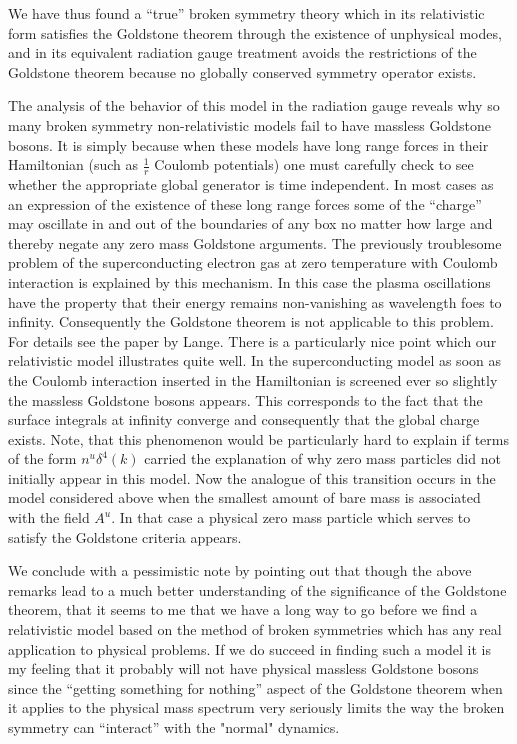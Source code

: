 \documentclass[%
  12pt,
  paper=letter,
  abstracton,
  pagesize=auto,
  version=last,
  DIV=calc
  ]{scrartcl}
\begin{document}
We have thus found a ``true'' broken symmetry theory which in its
relativistic form satisfies the Goldstone theorem through the
existence of unphysical modes, and in its equivalent radiation gauge
treatment avoids the restrictions of the Goldstone theorem because no
globally conserved symmetry operator exists.

The analysis of the behavior of this model in the radiation gauge
reveals why so many broken symmetry non-relativistic models fail to
have massless Goldstone bosons.  It is simply because when these
models have long range forces in their Hamiltonian (such as
$\frac{1}{r}$ Coulomb potentials) one must carefully check to see
whether the appropriate global generator is time independent.  In most
cases as an expression of the existence of these long range forces
some of the ``charge'' may oscillate in and out of the boundaries of any
box no matter how large and thereby negate any zero mass Goldstone
arguments.  The previously troublesome problem of the superconducting
electron gas at zero temperature with Coulomb interaction is explained
by this mechanism. \cite{7, 13}  In this case the plasma oscillations
have the property that their energy remains non-vanishing as
wavelength foes to infinity.  Consequently the Goldstone theorem is
not applicable to this problem.  For details see the paper by Lange.
There is a particularly nice point which our relativistic model
illustrates quite well.  In the superconducting model as soon as the
Coulomb interaction inserted in the Hamiltonian is screened ever so
slightly the massless Goldstone bosons appears.  This corresponds to
the fact that the surface integrals at infinity converge and
consequently that the global charge exists.  Note, that this
phenomenon would be particularly hard to explain if terms of the form
$n^u \delta^4 (k)$ carried the explanation of why zero mass particles
did not initially appear in this model.  Now the analogue of this
transition occurs in the model considered above when the smallest
amount of bare mass is associated with the field $A^u$.  In that case
a physical zero mass particle which serves to satisfy the Goldstone
criteria appears.

We conclude with a pessimistic note by pointing out that though the
above remarks lead to a much better understanding of the significance
of the Goldstone theorem, that it seems to me that we have a long way
to go before we find a relativistic model based on the method of
broken symmetries which has any real application to physical problems.
If we do succeed in finding such a model it is my feeling that it
probably will not have physical massless Goldstone bosons since the
``getting something for nothing'' aspect of the Goldstone theorem when
it applies to the physical mass spectrum very seriously limits the way
the broken symmetry can ``interact'' with the "normal" dynamics.
\end{document}
